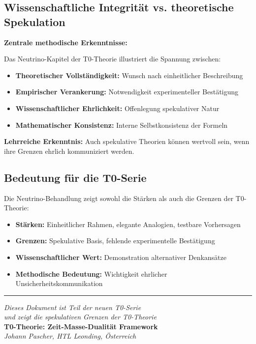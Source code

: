 \documentclass[12pt,a4paper]{article}
\begin{document}
	\subsection{Wissenschaftliche Integrität vs. theoretische Spekulation}
	
	\begin{keyresult}
		\textbf{Zentrale methodische Erkenntnisse:}
		
		Das Neutrino-Kapitel der T0-Theorie illustriert die Spannung zwischen:
		
		\begin{itemize}
			\item \textbf{Theoretischer Vollständigkeit:} Wunsch nach einheitlicher Beschreibung
			\item \textbf{Empirischer Verankerung:} Notwendigkeit experimenteller Bestätigung
			\item \textbf{Wissenschaftlicher Ehrlichkeit:} Offenlegung spekulativer Natur
			\item \textbf{Mathematischer Konsistenz:} Interne Selbstkonsistenz der Formeln
		\end{itemize}
		
		\textbf{Lehrreiche Erkenntnis:} Auch spekulative Theorien können wertvoll sein, wenn ihre Grenzen ehrlich kommuniziert werden.
	\end{keyresult}
	
	\subsection{Bedeutung für die T0-Serie}
	
	Die Neutrino-Behandlung zeigt sowohl die Stärken als auch die Grenzen der T0-Theorie:
	
	\begin{itemize}
		\item \textbf{Stärken:} Einheitlicher Rahmen, elegante Analogien, testbare Vorhersagen
		\item \textbf{Grenzen:} Spekulative Basis, fehlende experimentelle Bestätigung
		\item \textbf{Wissenschaftlicher Wert:} Demonstration alternativer Denkansätze
		\item \textbf{Methodische Bedeutung:} Wichtigkeit ehrlicher Unsicherheitskommunikation
	\end{itemize}
	
	\begin{center}
		\hrule
		\vspace{0.5cm}
		\textit{Dieses Dokument ist Teil der neuen T0-Serie}\\
		\textit{und zeigt die spekulativen Grenzen der T0-Theorie}\\
		\vspace{0.3cm}
		\textbf{T0-Theorie: Zeit-Masse-Dualität Framework}\\
		\textit{Johann Pascher, HTL Leonding, Österreich}\\
	\end{center}
	
\end{document}
